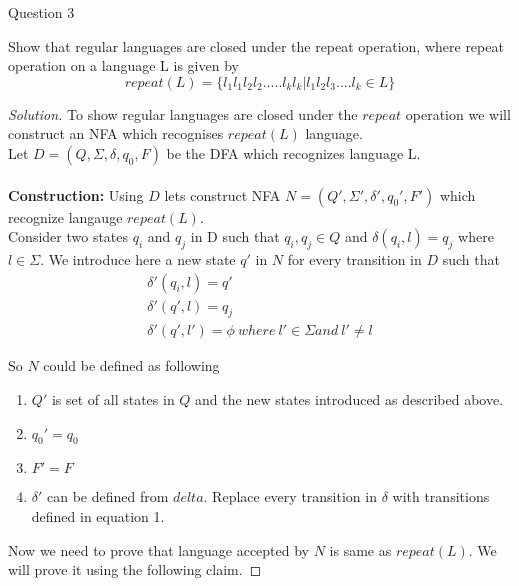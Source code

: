 \begin{solution}{Question 3}\label{ques:3}
    \begin{question}
    Show that regular languages are closed under the repeat operation, where repeat operation
    on a language L is given by
    \[
        repeat(L) = \{l_1 l_1 l_2 l_2 ..... l_k l_k | l_1 l_2 l_3....l_k \in L\}
    \]
    \end{question}
    \tcblower{}
    \begin{proof}[Solution]
        To show regular languages are closed under the $repeat$ operation we will construct an NFA which recognises $repeat(L)$ language.
        \\
        Let $D = (Q, \Sigma, \delta, q_0, F)$ be the DFA which recognizes language L.
        \\
        \\
        \textbf{Construction:} Using $D$ lets construct NFA $N = (Q', \Sigma', \delta', q_0', F')$ which recognize langauge $repeat(L)$.\\
        Consider two states $q_i$ and $q_j$ in D such that $q_i, q_j \in Q$ and $\delta(q_i, l) = q_j$ where $l \in \Sigma$. We introduce here a new state $q'$ in $N$ for every transition in $D$ such that 
        \begin{equation}
            \begin{split}
                \delta'(q_i, l) = q' \\
                \delta'(q', l) = q_j \\
                \delta'(q', l') = \phi\ where\ l' \in \Sigma and\ l' \neq l
            \end{split}
        \end{equation}
        
        So $N$ could be defined as following
        \begin{enumerate}
            \item $Q'$ is set of all states in $Q$ and the new states introduced as described above.
            \item $q_0' = q_0$
            \item $F' = F$
            \item $\delta'$ can be defined from $delta$. Replace every transition in $\delta$ with transitions defined in equation 1. 
        \end{enumerate}
        
        Now we need to prove that language accepted by $N$ is same as $repeat(L)$. We will prove it using the following claim.
        

\end{proof}
\end{solution}

